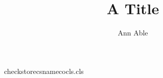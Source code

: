 \begin{filecontents*}[force]{checkstorecsnamecocls.cls}
\newcount\aucount
\def\author#1{\advance\aucount by 1 \gdef\@author{#1}}
\RequirePackage{etoolbox}
\def\viacs#1{\stepcounter{affn}\expandafter\gdef\csname aff\theaffn\endcsname{#1}}
\def\vianamed#1{\stepcounter{nafn}\@namedef{naf\thenafn}{#1}}
\def\viacsgdef#1{\stepcounter{csn}\csgdef{cs\thecsn}{#1}}
\def\agap{}\def\viagappto#1{\gappto\agap{#1\par}}
\renewcommand\maketitle{\par{\@title\par}\ifnum\aucount>0 {\@author\par}{\csname aff1\endcsname\par\csname aff2\endcsname\par\@nameuse{naf1}\par\@nameuse{naf2}\par\csuse{cs1}\par\csuse{cs2}\par\agap}\fi}
\end{filecontents*}
\documentclass{checkstorecsnamecocls}
\title{A Title}\author{Ann Able}
\maketitle
Body text.

